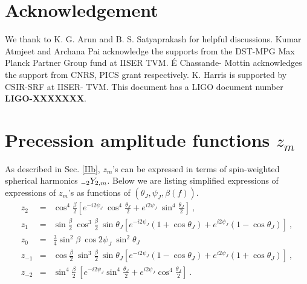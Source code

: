 \documentclass[preprint,onecolumn,,tightenlines,superscriptaddress,showpacs,nofootinbib,eqsecnum,amsfonts,amsmath]{revtex4}
\def\blue#1{\textcolor{blue}{#1}}
\begin{document}
\section{Acknowledgement} 

We thank to K. G. Arun and B. S. Satyaprakash for helpful discussions.  Kumar
Atmjeet and Archana Pai acknowledge the supports from the DST-MPG Max Planck
Partner Group fund at  IISER TVM. \'E Chassande- Mottin acknowledges the support
from CNRS, PICS grant respectively. K. Harris is supported by CSIR-SRF at IISER-
TVM.  This document has a LIGO document number {\bf LIGO-XXXXXXX}.
 

\appendix
\section{Precession amplitude functions $z_m$}\label{append}
As described in Sec. \ref{IIb}, $z_m$'s can be expressed in terms of spin-weighted spherical harmonics $\mathstrut_{-2}Y_{2,m}$. Below  we are listing simplified expressions of expressions of $z_m$'s  as functions of $(\theta_J, \psi_J, \beta(f))$.
\begin{eqnarray}
z_2 &=& \cos^4 \frac{\beta}{2}\left[e^{-i2\psi_J}~\cos^4 \frac{\theta_J}{2}+e^{i2\psi_J}~\sin^4 \frac{\theta_J}{2} \right]~,\\
z_1 &=&\sin\frac{\beta}{2}~\cos^3\frac{\beta}{2}~\sin \theta_J \left[e^{-i2\psi_J} (1 +  \cos \theta_J) + e^{i2\psi_J} (1- \cos \theta_J)  \right]  ~,\\
z_0 &=& \frac{3}{4} \sin^2 \beta~\cos2 \psi_J~\sin^2 \theta_J~\\
z_{-1} &=& \cos\frac{\beta}{2}~\sin^3\frac{\beta}{2}~\sin \theta_J \left[e^{-i2\psi_J} (1 -  \cos \theta_J) + e^{i2\psi_J} (1+ \cos \theta_J)  \right]  ~,\\
z_{-2} &=& \sin^4\frac{\beta}{2}~\left[e^{-i2\psi_J} \sin^4\frac{\theta_J}{2} + e^{i2\psi_J} \cos^4\frac{\theta_J}{2} \right] ~.
\end{eqnarray}


\end{document}
